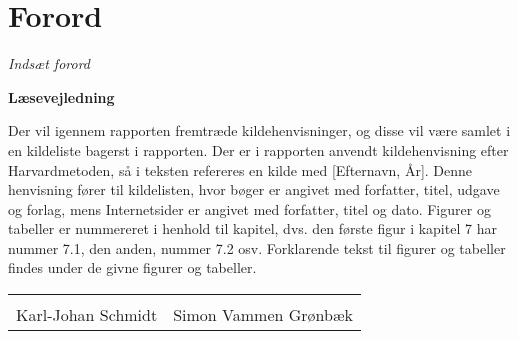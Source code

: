 \chapter*{Forord}

\textit{Indsæt forord}

\textbf{Læsevejledning}

Der vil igennem rapporten fremtræde kildehenvisninger, og disse vil være samlet i en kildeliste bagerst i rapporten. Der er i rapporten anvendt kildehenvisning efter Harvardmetoden, så i teksten refereres en kilde med [Efternavn, År]. Denne henvisning fører til kildelisten, hvor bøger er angivet med forfatter, titel, udgave og forlag, mens Internetsider er angivet med forfatter, titel og dato. Figurer og tabeller er nummereret i henhold til kapitel, dvs. den første figur i kapitel 7 har nummer 7.1, den anden, nummer 7.2 osv. Forklarende tekst til figurer og tabeller findes under de givne figurer og tabeller.


\vspace{3cm}
\begin{table}[H]
	\centering
		\begin{tabular}{c c}
			\underline{\phantom{mmmmmmmmmmmmmm}} & \underline{\phantom{mmmmmmmmmmmmmm}} \\
			Karl-Johan Schmidt	& Simon Vammen Grønbæk	\\
		\end{tabular}
\end{table}